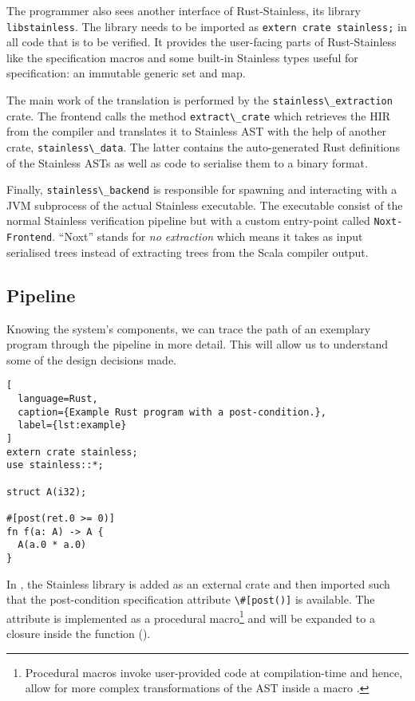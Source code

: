 The programmer also sees another interface of Rust-Stainless, its
library \lstinline!libstainless!. The library needs to be
imported as \passthrough{\lstinline!extern crate stainless;!} in all
code that is to be verified. It provides the user-facing parts of
Rust-Stainless like the specification macros and some built-in Stainless
types useful for specification: an immutable generic set and map.

The main work of the translation is performed by the
\passthrough{\lstinline!stainless\_extraction!} crate. The frontend
calls the method \passthrough{\lstinline!extract\_crate!} which
retrieves the HIR from the compiler and translates it to Stainless AST
with the help of another crate,
\passthrough{\lstinline!stainless\_data!}. The latter contains the
auto-generated Rust definitions of the Stainless ASTs as well as code to
serialise them to a binary format.

Finally, \passthrough{\lstinline!stainless\_backend!} is responsible for
spawning and interacting with a JVM subprocess of the actual Stainless
executable. The executable consist of the normal Stainless verification
pipeline but with a custom entry-point called
\passthrough{\lstinline!Noxt-Frontend!}. ``Noxt'' stands for \emph{no
extraction} which means it takes as input serialised trees instead of
extracting trees from the Scala compiler output.

\begin{quote}
\end{quote}

\subsection{Pipeline}

Knowing the system's components, we can trace the path of an exemplary
program through the pipeline in more detail. This will allow us to
understand some of the design decisions made.

\begin{lstlisting}[
  language=Rust,
  caption={Example Rust program with a post-condition.},
  label={lst:example}
]
extern crate stainless;
use stainless::*;

struct A(i32);

#[post(ret.0 >= 0)]
fn f(a: A) -> A {
  A(a.0 * a.0)
}
\end{lstlisting}

In , the Stainless library is added as an external crate
and then imported such that the post-condition specification attribute
\passthrough{\lstinline!\#[post()]!} is available. The attribute is implemented
as a procedural macro\footnote{Procedural macros invoke user-provided code at
compilation-time and hence, allow for more complex transformations of the AST
inside a macro \cite[section "Procedural Macros"]{rustref}.} and will be
expanded to a closure inside the function ().

